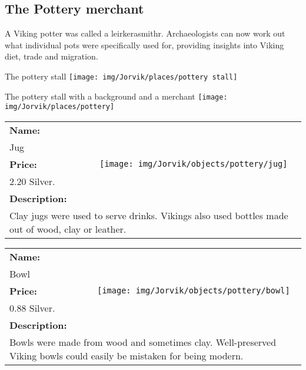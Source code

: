 

\clearpage
\subsection{The Pottery merchant}
\label{sec:appendix:moj:pottery}

A Viking potter was called a leirkerasmithr. Archaeologists can now work out what individual pots were specifically used for, providing insights into Viking diet, trade and migration.

\begin{display}{The pottery stall}
	\label{fig:appendix:moj:places:pottery:stall}
	\texttt{[image: img/Jorvik/places/pottery stall]}
\end{display}

\begin{display}{The pottery stall with a background and a merchant}
	\label{fig:appendix:moj:places:pottery}
	\texttt{[image: img/Jorvik/places/pottery]}
\end{display}
\clearpage


\begin{table}[ht!]
	\centering
	\begin{tabular}{ p{3cm} c }\toprule
		\textbf{Name:} & \multirow{5}{*}{\texttt{[image: img/Jorvik/objects/pottery/jug]}}\\
		Jug & \\ 
		\textbf{Price:} & \\
		2.20 Silver. & \\ 
		\textbf{Description:} & \\
		\multicolumn{2}{p{12cm}}{Clay jugs were used to serve drinks. Vikings also used bottles made out of wood, clay or leather.}\\
		\bottomrule
	\end{tabular}
\end{table}

\begin{table}[ht!]
	\centering
	\begin{tabular}{ p{3cm} c }\toprule
		\textbf{Name:} & \multirow{5}{*}{\texttt{[image: img/Jorvik/objects/pottery/bowl]}}\\
		Bowl & \\ 
		\textbf{Price:} & \\
		0.88 Silver. & \\ 
		\textbf{Description:} & \\
		\multicolumn{2}{p{12cm}}{Bowls were made from wood and sometimes clay. Well-preserved Viking bowls could easily be mistaken for being modern.}\\
		\bottomrule
	\end{tabular}
\end{table}

